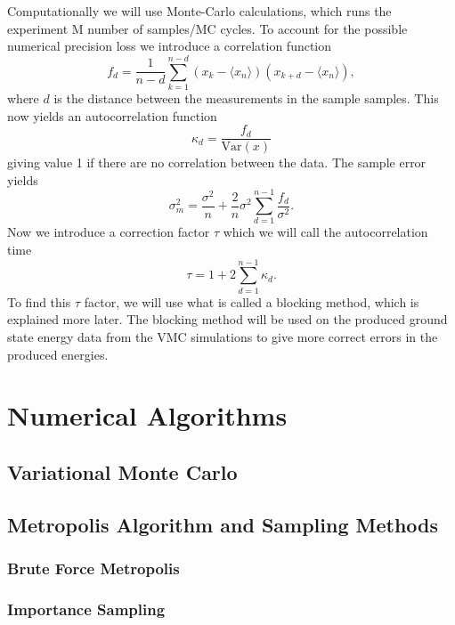 \documentclass[12pt,a4paper,english]{article}
\begin{document}
Computationally we will use Monte-Carlo calculations, which runs the experiment M number of samples/MC cycles. To account for the possible numerical precision loss we introduce a correlation function 
\begin{equation}
\label{eq:stat_corr_func}
f_d=\frac{1}{n-d}\sum_{k=1}^{n-d}(x_k-\langle x_n\rangle)(x_{k+d}-\langle x_n\rangle),
\end{equation}
where $d$ is the distance between the measurements in the sample samples. This now yields an autocorrelation function
\begin{equation}
\label{eq:stat_autocorr}
\kappa_d=\frac{f_d}{\text{Var}(x)}
\end{equation}
giving value 1 if there are no correlation between the data. The sample error yields
\begin{equation*}
\sigma_m^2=\frac{\sigma^2}{n}+\frac{2}{n}\sigma^2\sum_{d=1}^{n-1}\frac{f_d}{\sigma^2}.
\end{equation*}
Now we introduce a correction factor $\tau$ which we will call the autocorrelation time
\begin{equation}
\label{eq:stat_autocorr_time}
\tau= 1+2\sum_{d=1}^{n-1}\kappa_d.
\end{equation}
To find this $\tau$ factor, we will use what is called a blocking method, which is explained more later. The blocking method will be used on the produced ground state energy data from the VMC simulations to give more correct errors in the produced energies.

\section{Numerical Algorithms}
\label{sect:Num_algos}
\subsection{Variational Monte Carlo}
\label{subsect:VMC}
\subsection{Metropolis Algorithm and Sampling Methods}
\label{subsect:Sampling}
\subsubsection{Brute Force Metropolis}
\label{subsubsect:brute_Metropolis}
\subsubsection{Importance Sampling}
\label{subsubsect:Importance}
\end{document}
